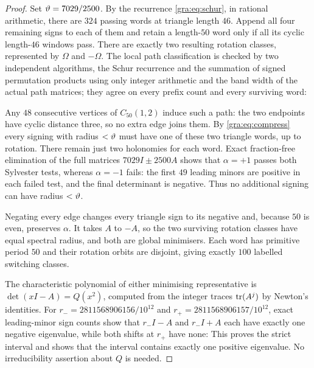 \begin{proof}
Set $\vartheta=7029/2500$. By the recurrence \eqref{gra:eq:schur}, in
rational arithmetic, there are $324$ passing words at triangle length
$46$. Append all four remaining signs to each of them and retain a
length-$50$ word only if all its cyclic length-$46$ windows pass. There
are exactly two resulting rotation classes, represented by $\Omega$ and
$-\Omega$. The local path classification is checked by two independent
algorithms, the Schur recurrence and the summation of signed permutation
products using only integer arithmetic and the band width of the actual
path matrices; they agree on every prefix count and every surviving word:

Any $48$ consecutive vertices of $C_{50}(1,2)$ induce such a path: the two
endpoints have cyclic distance three, so no extra edge joins them. By
\eqref{gra:eq:compress} every signing with radius $<\vartheta$ must have one
of these two triangle words, up to rotation. There remain just two
holonomies for each word. Exact fraction-free elimination of the full
matrices $7029I\pm2500A$ shows that $\alpha=+1$ passes both Sylvester
tests, whereas $\alpha=-1$ fails: the first $49$ leading minors are
positive in each failed test, and the final determinant is negative. Thus
no additional signing can have radius $<\vartheta$.

Negating every edge changes every triangle sign to its negative and,
because $50$ is even, preserves $\alpha$. It takes $A$ to $-A$, so the two
surviving rotation classes have equal spectral radius, and both are
global minimisers. Each word has primitive period $50$ and their rotation
orbits are disjoint, giving exactly $100$ labelled switching classes.

The characteristic polynomial of either minimising representative is
$\det(xI-A)=Q(x^2)$, computed from the integer traces $\operatorname{tr}(A^j)$ by
Newton's identities. For $r_-=2811568906156/10^{12}$ and
$r_+=2811568906157/10^{12}$, exact leading-minor sign counts show that
$r_-I-A$ and $r_-I+A$ each have exactly one negative eigenvalue, while
both shifts at $r_+$ have none:
This proves the strict interval and shows that the interval contains
exactly one positive eigenvalue. No irreducibility assertion about $Q$ is
needed.
\end{proof}

